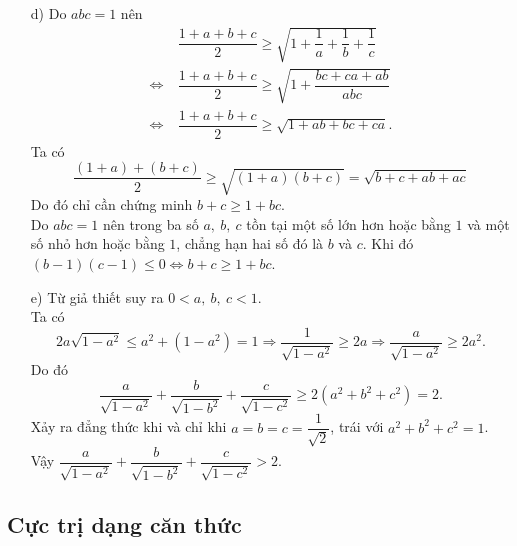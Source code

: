 \begin{bt}
{\begin{enumerate}
\begin{align*}
     \Leftrightarrow &\ \left(\sqrt{x}-\sqrt{y}\right)^2\left[\dfrac{\left(\sqrt{x}+\sqrt{y}\right)^2}{xy}-\dfrac{1}{2(x+y)}\right] \geq 0. \tag{1}
     \end{align*}
     Gọi $A$ là biểu thức trong dấu ngoặc vuông. Ta có
     $$\dfrac{\left(\sqrt{x}+\sqrt{y}\right)^2}{xy} \geq \dfrac{4\sqrt{xy}}{xy}=\dfrac{4}{\sqrt{xy}}=\dfrac{8}{2\sqrt{xy}} \geq \dfrac{8}{x+y}$$
     nên
     $$A \geq \dfrac{8}{x+y}-\dfrac{1}{2(x+y)}=\dfrac{15}{2(x+y)}>0.$$
     Vậy $(1)$ đúng nên bất đẳng thức đã cho được chứng minh. Xảy ra dấu đẳng thức khi và chỉ khi $x=y$.
     \item[d)] Do $abc=1$ nên
     \begin{align*}
     &\ \dfrac{1+a+b+c}{2} \geq \sqrt{1+\dfrac{1}{a}+\dfrac{1}{b}+\dfrac{1}{c}}\\
     \Leftrightarrow &\ \dfrac{1+a+b+c}{2} \geq \sqrt{1+\dfrac{bc+ca+ab}{abc}}\\ 
     \Leftrightarrow &\ \dfrac{1+a+b+c}{2} \geq \sqrt{1+ab+bc+ca}.
     \end{align*}
     Ta có 
     $$\dfrac{(1+a)+(b+c)}{2} \geq \sqrt{(1+a)(b+c)}=\sqrt{b+c+ab+ac}$$
     Do đó chỉ cần chứng minh $b+c \geq 1+bc$.\\
     Do $abc=1$ nên trong ba số $a,\ b,\ c$ tồn tại một số lớn hơn hoặc bằng $1$ và một số nhỏ hơn hoặc bằng $1$, chẳng hạn hai số đó là $b$ và $c$. Khi đó $(b-1)(c-1) \leq 0\Leftrightarrow b+c \geq 1+bc$.     
     \item[e)] Từ giả thiết suy ra $0<a,\ b,\ c<1$.\\
     Ta có
     $$2a\sqrt{1-a^2}\leq a^2+(1-a^2)=1\Rightarrow \dfrac{1}{\sqrt{1-a^2}}\geq 2a\Rightarrow \dfrac{a}{\sqrt{1-a^2}}\geq 2a^2.$$
     Do đó
     $$\dfrac{a}{\sqrt{1-a^2}}+\dfrac{b}{\sqrt{1-b^2}}+\dfrac{c}{\sqrt{1-c^2}}\geq 2(a^2+b^2+c^2)=2.$$
     Xảy ra đẳng thức khi và chỉ khi $a=b=c=\dfrac{1}{\sqrt{2}}$, trái với $a^2+b^2+c^2=1$.\\
     Vậy $\dfrac{a}{\sqrt{1-a^2}}+\dfrac{b}{\sqrt{1-b^2}}+\dfrac{c}{\sqrt{1-c^2}} > 2$.
\end{enumerate}            
    }
\end{bt}

\subsection*{Cực trị dạng căn thức}

